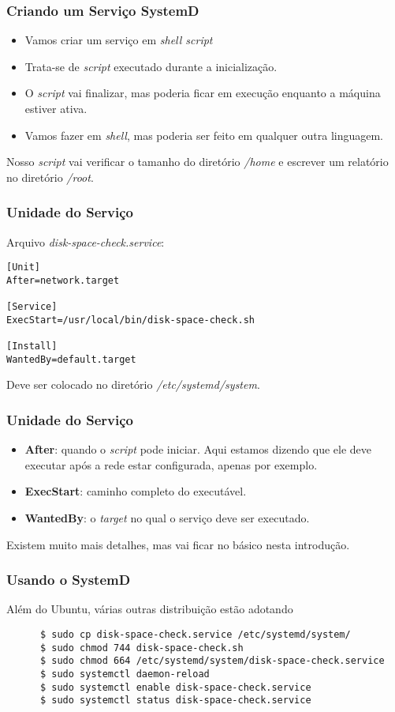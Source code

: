 \documentclass{beamer}
\begin{document}
   \begin{frame}
      \frametitle{Criando um Serviço SystemD}
      \begin{itemize}
          \item Vamos criar um serviço em \textit{shell script} 
	  \item Trata-se de \textit{script} executado durante a inicialização.
          \item O \textit{script} vai finalizar, mas poderia ficar em execução enquanto a máquina estiver ativa.
          \item Vamos fazer em \textit{shell}, mas poderia ser feito em qualquer outra linguagem.
      \end{itemize}
      Nosso \textit{script} vai verificar o tamanho do diretório \textit{/home} e escrever um relatório no diretório \textit{/root}.
   \end{frame}

   \begin{frame}[fragile]
      \frametitle{Unidade do Serviço}
      Arquivo \textit{disk-space-check.service}:
      \begin{verbatim}
[Unit]
After=network.target

[Service]
ExecStart=/usr/local/bin/disk-space-check.sh

[Install]
WantedBy=default.target
      \end{verbatim}
      Deve ser colocado no diretório \textit{/etc/systemd/system}.
\end{frame}

   \begin{frame}
      \frametitle{Unidade do Serviço}
      \begin{itemize}
         \item \textbf{After}: quando o \textit{script} pode iniciar. Aqui estamos dizendo que ele deve executar após a rede estar configurada, apenas por exemplo.	      
         \item \textbf{ExecStart}: caminho completo do executável.
	 \item \textbf{WantedBy}: o \textit{target} no qual o serviço deve ser executado.
      \end{itemize}
      Existem muito mais detalhes, mas vai ficar no básico nesta introdução.
   \end{frame}

   \begin{frame}
   \end{frame}  

   \begin{frame}[fragile]
      \frametitle{Usando o SystemD}
      Além do Ubuntu, várias outras distribuição estão adotando
      \scriptsize
      \begin{verbatim}
      $ sudo cp disk-space-check.service /etc/systemd/system/
      $ sudo chmod 744 disk-space-check.sh
      $ sudo chmod 664 /etc/systemd/system/disk-space-check.service
      $ sudo systemctl daemon-reload
      $ sudo systemctl enable disk-space-check.service
      $ sudo systemctl status disk-space-check.service 
      \end{verbatim}
\end{frame}
\end{document}
